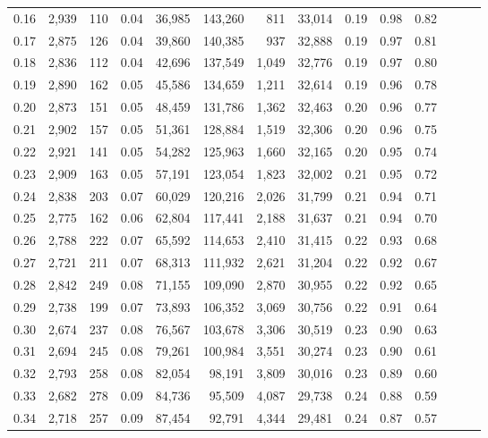 \begin{tabular}{rrrrrrrrrrrrrr}
0.16 &  2,939 &  110 &  0.04 &   36,985 &  143,260 &     811 &  33,014 &  0.19 &  0.98 &      0.82 \\
0.17 &  2,875 &  126 &  0.04 &   39,860 &  140,385 &     937 &  32,888 &  0.19 &  0.97 &      0.81 \\
0.18 &  2,836 &  112 &  0.04 &   42,696 &  137,549 &   1,049 &  32,776 &  0.19 &  0.97 &      0.80 \\
0.19 &  2,890 &  162 &  0.05 &   45,586 &  134,659 &   1,211 &  32,614 &  0.19 &  0.96 &      0.78 \\
0.20 &  2,873 &  151 &  0.05 &   48,459 &  131,786 &   1,362 &  32,463 &  0.20 &  0.96 &      0.77 \\
0.21 &  2,902 &  157 &  0.05 &   51,361 &  128,884 &   1,519 &  32,306 &  0.20 &  0.96 &      0.75 \\
0.22 &  2,921 &  141 &  0.05 &   54,282 &  125,963 &   1,660 &  32,165 &  0.20 &  0.95 &      0.74 \\
0.23 &  2,909 &  163 &  0.05 &   57,191 &  123,054 &   1,823 &  32,002 &  0.21 &  0.95 &      0.72 \\
0.24 &  2,838 &  203 &  0.07 &   60,029 &  120,216 &   2,026 &  31,799 &  0.21 &  0.94 &      0.71 \\
0.25 &  2,775 &  162 &  0.06 &   62,804 &  117,441 &   2,188 &  31,637 &  0.21 &  0.94 &      0.70 \\
0.26 &  2,788 &  222 &  0.07 &   65,592 &  114,653 &   2,410 &  31,415 &  0.22 &  0.93 &      0.68 \\
0.27 &  2,721 &  211 &  0.07 &   68,313 &  111,932 &   2,621 &  31,204 &  0.22 &  0.92 &      0.67 \\
0.28 &  2,842 &  249 &  0.08 &   71,155 &  109,090 &   2,870 &  30,955 &  0.22 &  0.92 &      0.65 \\
0.29 &  2,738 &  199 &  0.07 &   73,893 &  106,352 &   3,069 &  30,756 &  0.22 &  0.91 &      0.64 \\
0.30 &  2,674 &  237 &  0.08 &   76,567 &  103,678 &   3,306 &  30,519 &  0.23 &  0.90 &      0.63 \\
0.31 &  2,694 &  245 &  0.08 &   79,261 &  100,984 &   3,551 &  30,274 &  0.23 &  0.90 &      0.61 \\
0.32 &  2,793 &  258 &  0.08 &   82,054 &   98,191 &   3,809 &  30,016 &  0.23 &  0.89 &      0.60 \\
0.33 &  2,682 &  278 &  0.09 &   84,736 &   95,509 &   4,087 &  29,738 &  0.24 &  0.88 &      0.59 \\
0.34 &  2,718 &  257 &  0.09 &   87,454 &   92,791 &   4,344 &  29,481 &  0.24 &  0.87 &      0.57 \\

\end{tabular}
